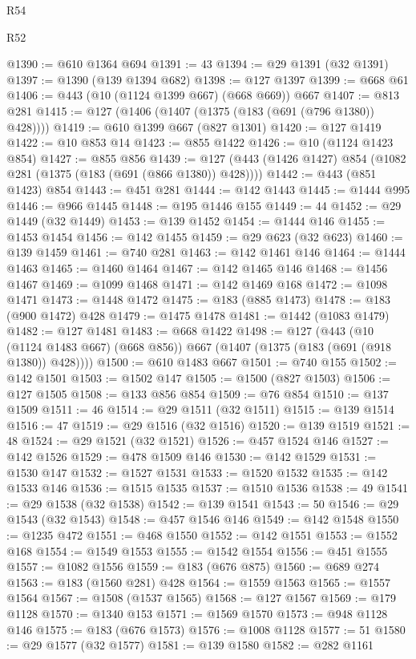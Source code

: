 \begin{lexlean}{R54}
\begin{lexlean}{R52}
\begin{coremodule}
{{{{{{{{{{{{{{{{{{{{{{{{{{{{{{{{{{{{{{{{{{{{{{{{{{{{{{{{{{{{{{{{{{{{{{{{{{{{{{{{{{{{{{{{{{{{{{{{{{{{{{{{{{{{{{{{{{{{{{{{{{{{{{{{{{{{{{{{{{{{{{{{{{{{{{{{{{{{{{{{{{{{{{{{{{{{{{{{{{{{{{{{{{{{{{{{{{{{{{@1390 := @610 @1364 @694
@1391 := 43
@1394 := @29 @1391 (@32 @1391)
@1397 := @1390 (@139 @1394 @682)
@1398 := @127 @1397
@1399 := @668 @61
@1406 := @443 (@10 (@1124 @1399 @667) (@668 @669)) @667
@1407 := @813 @281
@1415 := @127 (@1406 (@1407 (@1375 (@183 (@691 (@796 @1380)) @428))))
@1419 := @610 @1399 @667 (@827 @1301)
@1420 := @127 @1419
@1422 := @10 @853 @14
@1423 := @855 @1422
@1426 := @10 (@1124 @1423 @854)
@1427 := @855 @856
@1439 := @127 (@443 (@1426 @1427) @854 (@1082 @281 (@1375 (@183 (@691 (@866 @1380)) @428))))
@1442 := @443 (@851 @1423) @854
@1443 := @451 @281
@1444 := @142 @1443
@1445 := @1444 @995
@1446 := @966 @1445
@1448 := @195 @1446 @155
@1449 := 44
@1452 := @29 @1449 (@32 @1449)
@1453 := @139 @1452
@1454 := @1444 @146
@1455 := @1453 @1454
@1456 := @142 @1455
@1459 := @29 @623 (@32 @623)
@1460 := @139 @1459
@1461 := @740 @281
@1463 := @142 @1461 @146
@1464 := @1444 @1463
@1465 := @1460 @1464
@1467 := @142 @1465 @146
@1468 := @1456 @1467
@1469 := @1099 @1468
@1471 := @142 @1469 @168
@1472 := @1098 @1471
@1473 := @1448 @1472
@1475 := @183 (@885 @1473)
@1478 := @183 (@900 @1472) @428
@1479 := @1475 @1478
@1481 := @1442 (@1083 @1479)
@1482 := @127 @1481
@1483 := @668 @1422
@1498 := @127
    (@443 (@10 (@1124 @1483 @667) (@668 @856)) @667 (@1407 (@1375 (@183 (@691 (@918 @1380)) @428))))
@1500 := @610 @1483 @667
@1501 := @740 @155
@1502 := @142 @1501
@1503 := @1502 @147
@1505 := @1500 (@827 @1503)
@1506 := @127 @1505
@1508 := @133 @856 @854
@1509 := @76 @854
@1510 := @137 @1509
@1511 := 46
@1514 := @29 @1511 (@32 @1511)
@1515 := @139 @1514
@1516 := 47
@1519 := @29 @1516 (@32 @1516)
@1520 := @139 @1519
@1521 := 48
@1524 := @29 @1521 (@32 @1521)
@1526 := @457 @1524 @146
@1527 := @142 @1526
@1529 := @478 @1509 @146
@1530 := @142 @1529
@1531 := @1530 @147
@1532 := @1527 @1531
@1533 := @1520 @1532
@1535 := @142 @1533 @146
@1536 := @1515 @1535
@1537 := @1510 @1536
@1538 := 49
@1541 := @29 @1538 (@32 @1538)
@1542 := @139 @1541
@1543 := 50
@1546 := @29 @1543 (@32 @1543)
@1548 := @457 @1546 @146
@1549 := @142 @1548
@1550 := @1235 @472
@1551 := @468 @1550
@1552 := @142 @1551
@1553 := @1552 @168
@1554 := @1549 @1553
@1555 := @1542 @1554
@1556 := @451 @1555
@1557 := @1082 @1556
@1559 := @183 (@676 @875)
@1560 := @689 @274
@1563 := @183 (@1560 @281) @428
@1564 := @1559 @1563
@1565 := @1557 @1564
@1567 := @1508 (@1537 @1565)
@1568 := @127 @1567
@1569 := @179 @1128
@1570 := @1340 @153
@1571 := @1569 @1570
@1573 := @948 @1128 @146
@1575 := @183 (@676 @1573)
@1576 := @1008 @1128
@1577 := 51
@1580 := @29 @1577 (@32 @1577)
@1581 := @139 @1580
@1582 := @282 @1161
}}}}}}}}}}}}}}}}}}}}}}}}}}}}}}}}}}}}}}}}}}}}}}}}}}}}}}}}}}}}}}}}}}}}}}}}}}}}}}}}}}}}}}}}}}}}}}}}}}}}}}}}}}}}}}}}}}}}}}}}}}}}}}}}}}}}}}}}}}}}}}}}}}}}}}}}}}}}}}}}}}}}}}}}}}}}}}}}}}}}}}}}}}}}}}}}}}}}}}
\end{coremodule}
\end{lexlean}
\end{lexlean}
